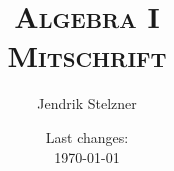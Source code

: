 \documentclass[a4paper,10pt]{book}
\begin{document}
\title{\textsc{Algebra I \\ Mitschrift}}
\author{Jendrik Stelzner}
\date{Last changes: \\ \today}

\frontmatter
\maketitle

\tableofcontents


\mainmatter





\addappheadtotoc
\appendix
\appendixpage

\end{document}
